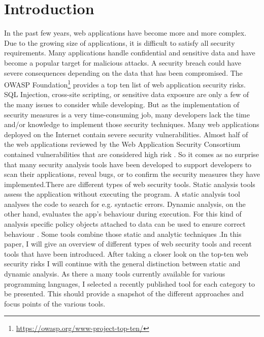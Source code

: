 \section{Introduction}
\label{section:Introduction}
In the past few years, web applications have become more and more complex. Due to the growing size of applications, it is difficult to satisfy all security requirements. Many applications handle confidential and sensitive data and have become a popular target for malicious attacks. A security breach could have severe consequences depending on the data that has been compromised.\newline
The OWASP Foundation\footnote{ \url{https://owasp.org/www-project-top-ten/}} provides a top ten list of web application security risks. SQL Injection, cross-site scripting, or sensitive data exposure are only a few of the many issues to consider while developing. But as the implementation of security measures is a very time-consuming job, many developers lack the time and/or knowledge to implement those security techniques. Many web applications deployed on the Internet contain severe security vulnerabilities. Almost half of the web applications reviewed by the Web Application Security Consortium contained vulnerabilities that are considered high risk \autocite[2]{Li2014}.
So it comes as no surprise that many security analysis tools have been developed to support developers to scan their applications, reveal bugs, or to confirm the security measures they have implemented.\newline There are different types of web security tools. Static analysis tools assess the application without executing the program. A static analysis tool analyses the code to search for e.g. syntactic errors. Dynamic analysis, on the other hand, evaluates the app's behaviour during execution. For this kind of analysis specific policy objects attached to data can be used to ensure correct behaviour \autocite[]{Yip2009, Felt2011}. Some tools combine those static and analytic techniques \autocite[]{Araujo2018, Jahanshahi2018, Lam2008,Hosek2011}.\newline In this paper, I will give an overview of different types of web security tools and recent tools that have been introduced. After taking a closer look on the top-ten web security risks I will continue with the general distinction between static and dynamic analysis. As there a many tools currently available for various programming languages, I selected a recently published tool for each category to be presented. This should provide a snapshot of the different approaches and focus points of the various tools.

